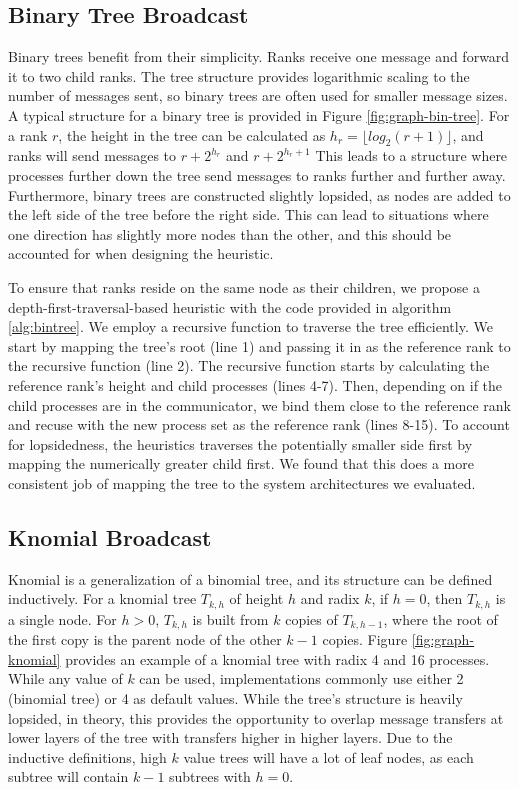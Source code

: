 \subsection{Binary Tree Broadcast}
Binary trees benefit from their simplicity.
Ranks receive one message and forward it to two child ranks.
The tree structure provides logarithmic scaling to the number of messages sent, so binary trees are often used for smaller message sizes. 
A typical structure for a binary tree is provided in Figure \ref{fig:graph-bin-tree}.
For a rank $r$, the height in the tree can be calculated as $h_r = \lfloor log_2(r+1) \rfloor$, and ranks will send messages to $r + 2^{h_r}$ and $r + 2^{h_r + 1}$
This leads to a structure where processes further down the tree send messages to ranks further and further away.
Furthermore, binary trees are constructed slightly lopsided,  as nodes are added to the left side of the tree before the right side. 
This can lead to situations where one direction has slightly more nodes than the other, and this should be accounted for when designing the heuristic.

To ensure that ranks reside on the same node as their children, we propose a depth-first-traversal-based heuristic with the code provided in algorithm \ref{alg:bintree}.
We employ a recursive function to traverse the tree efficiently. 
We start by mapping the tree's root (line 1) and passing it in as the reference rank to the recursive function (line 2).
The recursive function starts by calculating the reference rank's height and child processes (lines 4-7). 
Then, depending on if the child processes are in the communicator, we bind them close to the reference rank and recuse with the new process set as the reference rank (lines 8-15).
To account for lopsidedness, the heuristics traverses the potentially smaller side first by mapping the numerically greater child first.
We found that this does a more consistent job of mapping the tree to the system architectures we evaluated.




\subsection{Knomial Broadcast}
Knomial is a generalization of a binomial tree, and its structure can be defined inductively.
For a knomial tree $T_{k,h}$ of height $h$ and radix $k$, if $h=0$, then $T_{k,h}$ is a single node. For $h>0$, $T_{k,h}$ is built from $k$ copies of $T_{k,h-1}$, where the root of the first copy is the parent node of the other $k-1$ copies.
Figure \ref{fig:graph-knomial} provides an example of a knomial tree with radix 4 and 16 processes.
While any value of $k$ can be used, implementations commonly use either 2 (binomial tree) or 4 as default values. 
While the tree's structure is heavily lopsided, in theory, this provides the opportunity to overlap message transfers at lower layers of the tree with transfers higher in higher layers.
Due to the inductive definitions, high $k$ value trees will have a lot of leaf nodes, as each subtree will contain $k-1$ subtrees with $h=0$.

